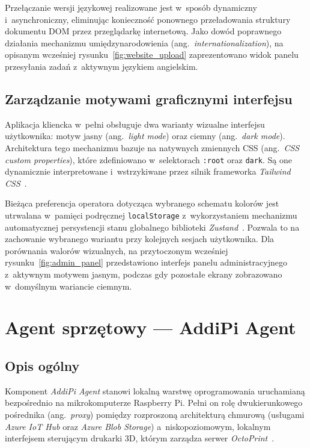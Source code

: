 \documentclass[a4paper,12pt,reqno]{article}
\begin{document}
Przełączanie wersji językowej realizowane jest w~sposób dynamiczny i~asynchroniczny, eliminując konieczność ponownego przeładowania struktury dokumentu DOM przez przeglądarkę internetową. Jako dowód poprawnego działania mechanizmu umiędzynarodowienia (ang.~\textit{internationalization}), na opisanym wcześniej rysunku~\ref{fig:website_upload} zaprezentowano widok panelu przesyłania zadań z~aktywnym językiem angielskim.

\subsection{Zarządzanie motywami graficznymi interfejsu}

Aplikacja kliencka w~pełni obsługuje dwa warianty wizualne interfejsu użytkownika: motyw jasny (ang.~\textit{light mode}) oraz ciemny (ang.~\textit{dark mode}). Architektura tego mechanizmu bazuje na natywnych zmiennych CSS (ang.~\textit{CSS custom properties}), które zdefiniowano w~selektorach \texttt{:root} oraz \texttt{dark}. Są one dynamicznie interpretowane i~wstrzykiwane przez silnik frameworka \textit{Tailwind CSS}~\cite{tailwind}.

Bieżąca preferencja operatora dotycząca wybranego schematu kolorów jest utrwalana w~pamięci podręcznej \texttt{localStorage} z~wykorzystaniem mechanizmu automatycznej persystencji stanu globalnego biblioteki \textit{Zustand}~\cite{zustand}. Pozwala to na zachowanie wybranego wariantu przy kolejnych sesjach użytkownika. Dla porównania walorów wizualnych, na przytoczonym wcześniej rysunku~\ref{fig:admin_panel} przedstawiono interfejs panelu administracyjnego z~aktywnym motywem jasnym, podczas gdy pozostałe ekrany zobrazowano w~domyślnym wariancie ciemnym.


\newpage

\section{Agent sprzętowy --- AddiPi Agent}
\label{sec:agent}

\subsection{Opis ogólny}

Komponent \textit{AddiPi Agent} stanowi lokalną warstwę oprogramowania uruchamianą bezpośrednio na mikrokomputerze Raspberry Pi. Pełni on rolę dwukierunkowego pośrednika (ang.~\textit{proxy}) pomiędzy rozproszoną architekturą chmurową (usługami \textit{Azure IoT Hub} oraz \textit{Azure Blob Storage}) a~niskopoziomowym, lokalnym interfejsem sterującym drukarki 3D, którym zarządza serwer \textit{OctoPrint}~\cite{octoprint}.
\end{document}
